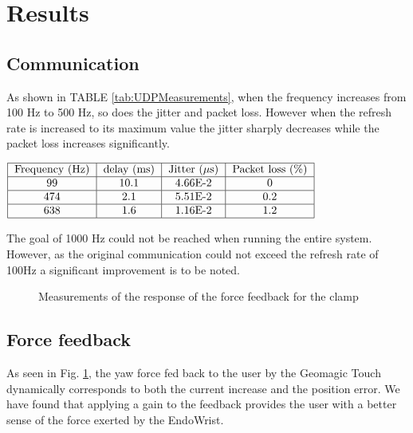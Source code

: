 \section{Results}

\subsection{Communication}

As shown in TABLE \ref{tab:UDPMeasurements}, when the frequency increases from 100 Hz to 500 Hz, so does the jitter and packet loss. However when the refresh rate is increased to its maximum value the jitter sharply decreases while the packet loss increases significantly.

\begin{center}
  $\begin{tabular}{|c|c|c|c|c|c|}
    \hline
    \text{Frequency (Hz)} & \text{delay (ms)} & \text{Jitter ($\mu$s)} & \text{Packet loss (\%)}\\
    \hline
    99 & 10.1 & 4.66E-2 & 0 \\
    \hline
    474 & 2.1 & 5.51E-2 & 0.2 \\
    \hline
    638 & 1.6 & 1.16E-2 & 1.2 \\
    \hline
  \end{tabular}$
  \label{tab:UDPMeasurements}
\end{center}
The goal of 1000 Hz could not be reached when running the entire system. However, as the original communication could not exceed the refresh rate of 100Hz a significant improvement is to be noted.

\begin{figure}[h]
  
  \caption{Measurements of the response of the force feedback for the clamp}
  \label{fbkm}
\end{figure}


\subsection{Force feedback}
As seen in Fig. \ref{fbkm}, the yaw force fed back to the user by the Geomagic Touch dynamically corresponds to both the current increase and the position error.
We have found that applying a gain to the feedback provides the user with a better sense of the force exerted by the EndoWrist.




